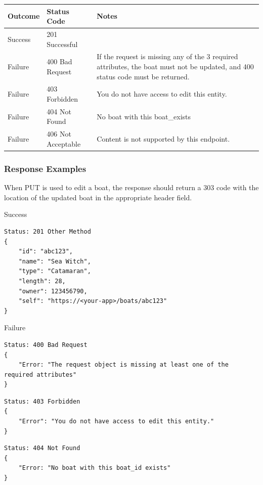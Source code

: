 \documentclass[letterpaper,11pt,titlepage,draftclsnofoot,onecolumn,compsoc,utf8,latin1]{IEEEtran}
\begin{document}
\begin{singlespace}
\begin{center}
\begin{tabular}{ |p{}|p{}|p{}| } 
 \hline
 \textbf{Outcome} & \textbf{Status Code} & \textbf{Notes}  \\  \hline
 Success & 201 Successful & \\ \hline
 Failure & 400 Bad Request &  
 If the request is missing any of the 3 required attributes, the boat must not be updated, and 400 status code must be returned.\\ \hline
 Failure & 403 Forbidden & You do not have access to edit this entity. \\ \hline
 Failure & 404 Not Found & No boat with this boat_exists \\ \hline
 Failure & 406 Not Acceptable & Content is not supported by this endpoint. \\
 \hline
\end{tabular}
\end{center}

\subsubsection{Response Examples}

When PUT is used to edit a boat, the response should return a 303 code with the location of the updated boat in the appropriate header field.

\noindent \Large{Success}

\begin{lstlisting}[]
Status: 201 Other Method
{
    "id": "abc123",
    "name": "Sea Witch",
    "type": "Catamaran",
    "length": 28,
    "owner": 123456790,
    "self": "https://<your-app>/boats/abc123"
}
\end{lstlisting}

\noindent \Large{Failure}

\begin{lstlisting}[]
Status: 400 Bad Request
{
    "Error: "The request object is missing at least one of the required attributes"
}
\end{lstlisting}

\begin{lstlisting}[]
Status: 403 Forbidden
{
    "Error": "You do not have access to edit this entity."
}
\end{lstlisting}

\begin{lstlisting}[]
Status: 404 Not Found
{
    "Error: "No boat with this boat_id exists"
}
\end{lstlisting}


\end{singlespace}
\end{document}
